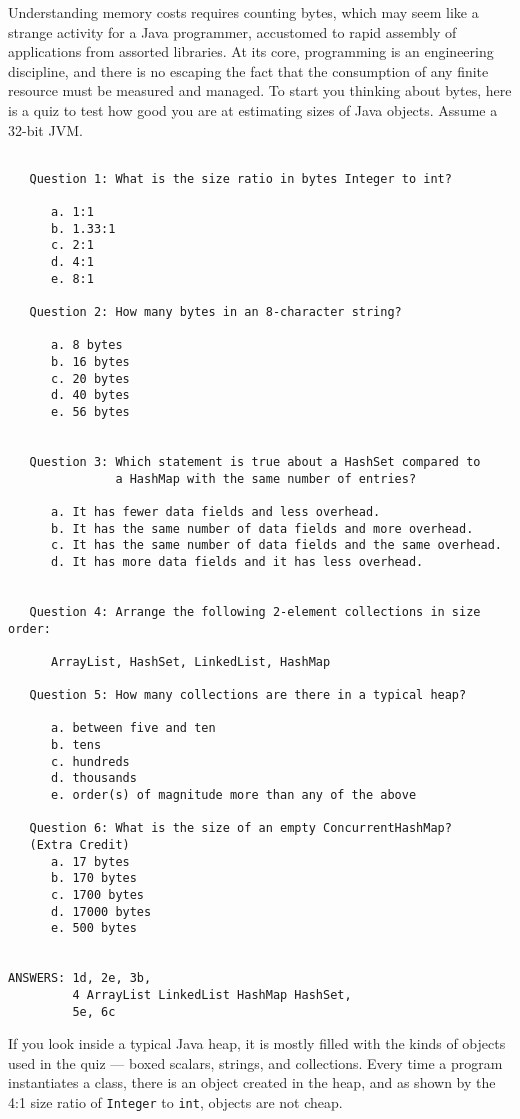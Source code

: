 Understanding memory costs requires counting bytes, which may seem like a strange activity for a Java programmer, accustomed to rapid assembly of applications from assorted libraries. At its core, programming is an engineering discipline, and there is no escaping the fact that the consumption of any finite resource must be measured and managed.  To start you thinking about bytes, here is a quiz to test how good you are at estimating sizes of Java objects. Assume a 32-bit JVM.
\begin{verbatim}

   Question 1: What is the size ratio in bytes Integer to int?
   
      a. 1:1
      b. 1.33:1
      c. 2:1
      d. 4:1
      e. 8:1
   
   Question 2: How many bytes in an 8-character string?

      a. 8 bytes
      b. 16 bytes
      c. 20 bytes
      d. 40 bytes
      e. 56 bytes
 
   
   Question 3: Which statement is true about a HashSet compared to 
               a HashMap with the same number of entries?
               
      a. It has fewer data fields and less overhead.
      b. It has the same number of data fields and more overhead.
      c. It has the same number of data fields and the same overhead.
      d. It has more data fields and it has less overhead.
                  
                       
   Question 4: Arrange the following 2-element collections in size order:
    
      ArrayList, HashSet, LinkedList, HashMap
          
   Question 5: How many collections are there in a typical heap?
   
      a. between five and ten
      b. tens
      c. hundreds
      d. thousands
      e. order(s) of magnitude more than any of the above

   Question 6: What is the size of an empty ConcurrentHashMap?
   (Extra Credit)
      a. 17 bytes
      b. 170 bytes
      c. 1700 bytes
      d. 17000 bytes
      e. 500 bytes
           

ANSWERS: 1d, 2e, 3b, 
         4 ArrayList LinkedList HashMap HashSet, 
         5e, 6c                 
\end{verbatim}

If you look inside a typical Java heap, it is mostly filled with the kinds of objects used in the quiz --- boxed scalars, strings, and collections. Every time a program instantiates a class, there is an object created in the heap, and as shown by the 4:1 size ratio of \texttt{Integer} to \texttt{int}, objects are not cheap. 

